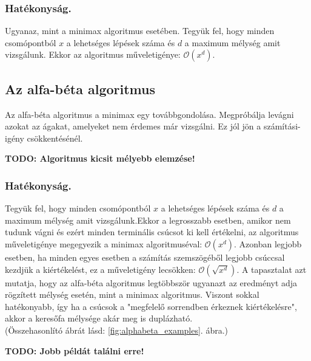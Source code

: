\documentclass[twoside, a4paper, 12pt]{article}
\begin{document}
\subsubsection{Hatékonyság.} Ugyanaz, mint a minimax algoritmus esetében. Tegyük fel, hogy minden csomópontból $x$ a lehetséges lépések száma és $d$ a maximum mélység amit vizsgálunk. Ekkor az algoritmus műveletigénye: $ \mathcal{O}(x^d)$.

\subsection{Az alfa-béta algoritmus}
Az alfa-béta algoritmus a minimax egy továbbgondolása. Megpróbálja levágni azokat az ágakat, amelyeket nem érdemes már vizsgálni. Ez jól jön a számítási-igény csökkentésénél.

\textbf{TODO: Algoritmus kicsit mélyebb elemzése!}

\subsubsection{Hatékonyság.} Tegyük fel, hogy minden csomópontból $x$ a lehetséges lépések száma és $d$ a maximum mélység amit vizsgálunk.Ekkor a legrosszabb esetben, amikor nem tudunk vágni és ezért minden terminális csúcsot ki kell értékelni, az algoritmus műveletigénye megegyezik a minimax algoritmuséval: $ \mathcal{O}(x^d)$.
Azonban legjobb esetben, ha minden egyes esetben a számítás szemszögéből legjobb csúccsal kezdjük a kiértékelést, ez a műveletigény lecsökken: $\mathcal{O}(\sqrt{x^d})$.
A tapasztalat azt mutatja, hogy az alfa-béta algoritmus legtöbbször ugyanazt az eredményt adja rögzített mélység esetén, mint a minimax algoritmus. Viszont sokkal hatékonyabb, így ha a csúcsok a "megfelelő sorrendben érkeznek kiértékelésre", akkor a keresőfa mélysége akár meg is duplázható. \\ (Összehasonlító ábrát lásd: \ref{fig:alphabeta_examples}. ábra.)

\textbf{TODO: Jobb példát találni erre!}
\end{document}
